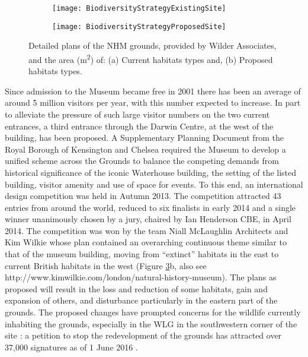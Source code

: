 \begin{figure}
	\centering

	\begin{subfigure}[t]{0.45\textwidth}
		\centering
		\texttt{[image: BiodiversityStrategyExistingSite]}
       		 \caption{}\label{fig:fig_a}
	\end{subfigure}
%
	\begin{subfigure}[t]{0.45\textwidth}
		\centering
		\texttt{[image: BiodiversityStrategyProposedSite]}
		\caption{}\label{fig:fig_b}
	\end{subfigure}
	\caption{Detailed plans of the NHM grounds, provided by Wilder Associates, and the area (m\textsuperscript{2}) of: (a) Current habitats types and, (b) Proposed habitats types.}
	\label{fig:wlgplan_after}
\end{figure}

Since admission to the Museum became free in 2001 there has been an average of around 5 million visitors per year, with this number expected to increase. In part to alleviate the pressure of such large visitor numbers on the two current entrances, a third entrance through the Darwin Centre, at the west of the building, has been proposed. A Supplementary Planning Document from the Royal Borough of Kensington and Chelsea \citep{rbkc:2012} required the Museum to develop a unified scheme across the Grounds to balance the competing demands from historical significance of the iconic Waterhouse building, the setting of the listed building, visitor amenity and use of space for events. To this end, an international design competition was held in Autumn 2013. The competition attracted 43 entries from around the world, reduced to six finalists in early 2014 and a single winner unanimously chosen by a jury, chaired by Ian Henderson CBE, in April 2014. The competition was won by the team Niall McLaughlin Architects and Kim Wilkie whose plan contained an overarching continuous theme similar to that of the museum building, moving from ``extinct'' habitats in the east to current British habitats in the west (Figure \ref{fig:wlgplan_after}b, also see http://www.kimwilkie.com/london/natural-history-museum). The plans as proposed will result in the loss and reduction of some habitats, gain and expansion of others, and disturbance particularly in the eastern part of the grounds. The proposed changes have prompted concerns for the wildlife currently inhabiting the grounds, especially in the WLG in the southwestern corner of the site \citep{prospect:2015wg,guardian:2015wg,avery:2015wg,telegraph:2015wg,dailymail:2015wg}: a petition to stop the redevelopment of the grounds has attracted over 37,000 signatures as of 1 June 2016 \citep{changepetition:2015wg}.  

